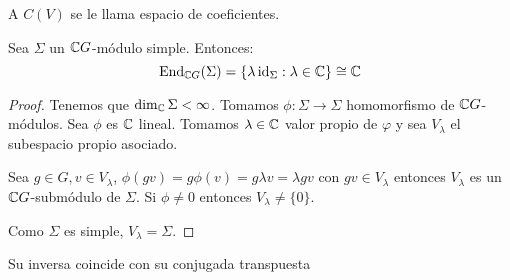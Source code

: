 \begin{df}
  A \(C(V)\) se le llama espacio de coeficientes.
\end{df}


\begin{lema}[de Schur]
  Sea \(\Sigma\) un \(\mathbb{C} G\)-módulo simple. Entonces:
  \[
    \operatorname{End}_{\mathbb{C} G}(\Sigma)=\{\lambda \operatorname{id}_\Sigma :\lambda \in\mathbb{C}\}\cong\mathbb{C}
  \]
\end{lema}
\begin{proof}
  Tenemos que \(\dim_{\mathbb{C}} \Sigma<\infty\). Tomamos
  \(\phi:\Sigma\longrightarrow\Sigma\) homomorfismo de \(\mathbb{C} G\)-módulos.
  Sea \(\phi\) es \(\mathbb{C}\) lineal. Tomamos \(\lambda \in\mathbb{C}\) valor
  propio de \(\varphi\) y sea \(V_\lambda\) el subespacio propio asociado.

  Sea \(g\in G, v\in V_\lambda\), \(\phi(gv)=g\phi(v)=g\lambda v=\lambda g v\)
  con \(gv\in V_\lambda\) entonces \(V_\lambda\) es un \(\mathbb{C} G\)-submódulo de
  \(\Sigma\). Si \(\phi\neq 0\) entonces \(V_\lambda\neq\{0\}\).

  Como \(\Sigma\) es simple, \(V_\lambda = \Sigma\).
\end{proof}

\begin{df}
  Su inversa coincide con su conjugada transpuesta
\end{df}

